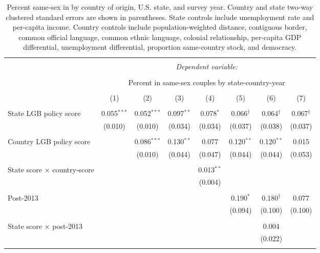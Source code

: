\documentclass[
  11pt,
]{article}
\begin{document}
\begin{table}[!htbp] \centering 
  \caption{Percent same-sex in by country of origin, U.S. state, and survey year. Country and state two-way clustered standard errors are shown in parentheses. State controls include unemployment rate and per-capita income. Country controls include population-weighted distance, contiguous border, common official language, common ethnic language, colonial relationship, per-capita GDP differential, unemployment differential, proportion same-country stock, and democracy.} 
  \label{tab:state-props} 
\begin{tabular}{@{\extracolsep{5pt}}lccccccc} 
\\[-1.8ex]\hline 
\hline \\[-1.8ex] 
 & \multicolumn{7}{c}{\textit{Dependent variable:}} \\ 
\cline{2-8} 
\\[-1.8ex] & \multicolumn{7}{c}{Percent in same-sex couples by state-country-year} \\ 
\\[-1.8ex] & (1) & (2) & (3) & (4) & (5) & (6) & (7)\\ 
\hline \\[-1.8ex] 
 State LGB policy score & 0.055$^{***}$ & 0.052$^{***}$ & 0.097$^{**}$ & 0.078$^{*}$ & 0.066$^{†}$ & 0.064$^{†}$ & 0.067$^{†}$ \\ 
  & (0.010) & (0.010) & (0.034) & (0.034) & (0.037) & (0.038) & (0.037) \\ 
  & & & & & & & \\ 
 Country LGB policy score &  & 0.086$^{***}$ & 0.130$^{**}$ & 0.077 & 0.120$^{**}$ & 0.120$^{**}$ & 0.015 \\ 
  &  & (0.010) & (0.044) & (0.047) & (0.044) & (0.044) & (0.053) \\ 
  & & & & & & & \\ 
 State score × country-score &  &  &  & 0.013$^{**}$ &  &  &  \\ 
  &  &  &  & (0.004) &  &  &  \\ 
  & & & & & & & \\ 
 Post-2013 &  &  &  &  & 0.190$^{*}$ & 0.180$^{†}$ & 0.077 \\ 
  &  &  &  &  & (0.094) & (0.100) & (0.100) \\ 
  & & & & & & & \\ 
 State score × post-2013 &  &  &  &  &  & 0.004 &  \\ 
  &  &  &  &  &  & (0.022) &  \\ 
  & & & & & & & \\ 

\end{tabular}
\end{table}
\end{document}
